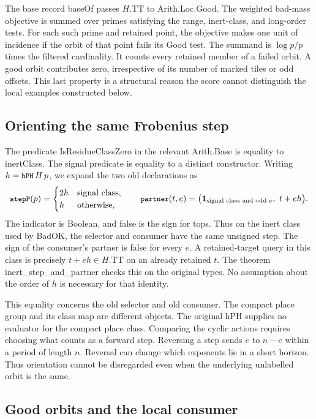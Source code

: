 \documentclass[12pt,letterpaper]{article}
\DeclareRobustCommand{\id}[1]{\mbox{\small\ttfamily #1}}
\begin{document}
The base record \id{baseOf} passes $H.\mathrm{TT}$ to \id{Arith.Loc.Good}. The weighted bad-mass objective is summed over primes satisfying the range, inert-class, and long-order tests. For each such prime and retained point, the objective makes one unit of incidence if the orbit of that point fails its Good test. The summand is $\log p/p$ times the filtered cardinality. It counts every retained member of a failed orbit. A good orbit contributes zero, irrespective of its number of marked tiles or odd offsets. This last property is a structural reason the score cannot distinguish the local examples constructed below.

\subsection{Orienting the same Frobenius step}

The predicate \id{IsResidueClassZero} in the relevant \id{Arith.Base} is equality to \id{inertClass}. The signal predicate is equality to a distinct constructor. Writing $h=\id{hPH}\,H\,p$, we expand the two old declarations as
\[
 \id{stepP}(p)=
 \begin{cases}2h&\text{signal class},\\h&\text{otherwise},\end{cases}
 \qquad
 \id{partner}(t,e)=
  \bigl(\mathbf1_{\text{signal class and odd }e},\ t+eh\bigr).
\]
The indicator is Boolean, and false is the sign for tops. Thus on the inert class used by \id{BadOK}, the selector and consumer have the same unsigned step. The sign of the consumer's partner is false for every $e$. A retained-target query in this class is precisely $t+eh\in H.\mathrm{TT}$ on an already retained $t$. The theorem \id{inert\_step\_and\_partner} checks this on the original types. No assumption about the order of $h$ is necessary for that identity.

This equality concerns the old selector and old consumer. The compact place group and its class map are different objects. The original \id{hPH} supplies no evaluator for the compact place class. Comparing the cyclic actions requires choosing what counts as a forward step. Reversing a step sends $e$ to $n-e$ within a period of length $n$. Reversal can change which exponents lie in a short horizon. Thus orientation cannot be disregarded even when the underlying unlabelled orbit is the same.

\subsection{Good orbits and the local consumer}
\end{document}
